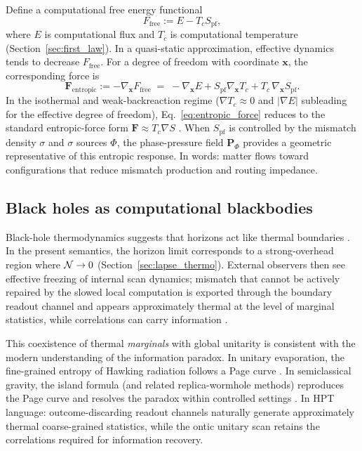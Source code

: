 Define a computational free energy functional
\begin{equation}
F_{\mathrm{free}} := E - T_c S_{\mathrm{pf}},
\end{equation}
where $E$ is computational flux and $T_c$ is computational temperature (Section~\ref{sec:first_law}). In a quasi-static approximation, effective dynamics tends to decrease $F_{\mathrm{free}}$. For a degree of freedom with coordinate $\mathbf{x}$, the corresponding force is
\begin{equation}
\mathbf{F}_{\mathrm{entropic}} := -\nabla_{\mathbf{x}} F_{\mathrm{free}}
\;=\; -\nabla_{\mathbf{x}}E + S_{\mathrm{pf}}\nabla_{\mathbf{x}}T_c + T_c\,\nabla_{\mathbf{x}} S_{\mathrm{pf}}.
\label{eq:entropic_force}
\end{equation}
\noindent In the isothermal and weak-backreaction regime ($\nabla T_c\approx 0$ and $|\nabla E|$ subleading for the effective degree of freedom), Eq.~\eqref{eq:entropic_force} reduces to the standard entropic-force form $\mathbf{F}\approx T_c\nabla S$ \cite{LandauLifshitz1980}. When $S_{\mathrm{pf}}$ is controlled by the mismatch density $\sigma$ and $\sigma$ sources $\Phi$, the phase-pressure field $\mathbf{P}_\Phi$ provides a geometric representative of this entropic response. In words: matter flows toward configurations that reduce mismatch production and routing impedance.

\subsection{Black holes as computational blackbodies}

Black-hole thermodynamics suggests that horizons act like thermal boundaries \cite{Bekenstein1973,Hawking1975,Unruh1976}. In the present semantics, the horizon limit corresponds to a strong-overhead region where $\mathcal{N}\to 0$ (Section~\ref{sec:lapse_thermo}). External observers then see effective freezing of internal scan dynamics; mismatch that cannot be actively repaired by the slowed local computation is exported through the boundary readout channel and appears approximately thermal at the level of marginal statistics, while correlations can carry information \cite{Ma2025HPD}.

This coexistence of thermal \emph{marginals} with global unitarity is consistent with the modern understanding of the information paradox. In unitary evaporation, the fine-grained entropy of Hawking radiation follows a Page curve \cite{Page1993}. In semiclassical gravity, the island formula (and related replica-wormhole methods) reproduces the Page curve and resolves the paradox within controlled settings \cite{Almheiri2019,Penington2020}. In HPT language: outcome-discarding readout channels naturally generate approximately thermal coarse-grained statistics, while the ontic unitary scan retains the correlations required for information recovery.


